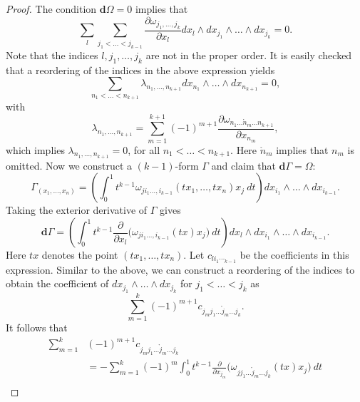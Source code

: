 \begin{proof}
The condition $\mathbf d \Omega = 0$ implies that
\begin{equation*}
	\sum_l \sum_{j_1<\dots<j_{k-1}} \frac{\partial \omega_{j_1,\dots,j_k}}{\partial x_l} dx_l\wedge dx_{j_1}\wedge \dots \wedge dx_{j_k} = 0.
\end{equation*}
Note that the indices $l,j_1,\dots,j_k$ are not in the proper order. It is easily checked that a reordering of the indices in the above expression yields
\begin{equation*}
	\sum_{n_1<\dots<n_{k+1}}\lambda_{n_1,\dots,n_{k+1}} dx_{n_1}\wedge \dots \wedge dx_{n_{k+1}} = 0,
\end{equation*}
with
\begin{equation*}
	\lambda_{n_1,\dots,n_{k+1}} = \sum_{m=1}^{k+1} (-1)^{m+1} \frac{\partial \omega_{n_1\dots\mathring n_m \dots n_{k+1}}}{\partial x_{n_m}},
\end{equation*}
which implies $\lambda_{n_1,\dots,n_{k+1}} = 0$, for all $n_1<\dots<n_{k+1}$. Here $\mathring n_m$ implies that $n_m$ is omitted. Now we construct a $(k-1)$-form $\Gamma$ and claim that $\mathbf d \Gamma = \Omega$:
\begin{equation*}
	\Gamma_{(x_1,\dots,x_n)} = \left( \int_0^1 t^{k-1} \omega_{ji_1\dots,i_{k-1}}(tx_1,\dots,tx_n) x_j \ dt \right) dx_{i_1}\wedge \dots \wedge dx_{i_{k-1}}.
\end{equation*}
Taking the exterior derivative of $\Gamma$ gives
\begin{equation*}
	\mathbf d \Gamma = \left( \int_0^1 t^{k-1} \frac{\partial }{\partial x_l} \big( \omega_{ji_1\dots,i_{k-1}}(tx) x_j \big) \ dt \right) dx_l\wedge dx_{i_1}\wedge \dots \wedge dx_{i_{k-1}}.
\end{equation*}
Here $tx$ denotes the point $(tx_1,\dots,tx_n)$. Let $c_{li_1\dotsi_{k-1}}$ be the coefficients in this expression. Similar to the above, we can construct a reordering of the indices to obtain the coefficient of $dx_{j_1}\wedge\dots\wedge dx_{j_k}$ for $j_1<\dots<j_{k}$ as
\begin{equation*}
	\sum_{m=1}^{k} (-1)^{m+1} c_{j_mj_1\dots\mathring j_{m}\dots j_k}.
\end{equation*}
It follows that
\begin{equation*}
\begin{aligned}
\sum_{m=1}^{k} &(-1)^{m+1} c_{j_mj_1\dots\mathring j_{m}\dots j_k} \\
	& = -\sum_{m=1}^k (-1)^m \int_0^1 t^{k-1} \frac{\partial}{\partial x_{j_m}}\big( \omega_{jj_1\dots\mathring j_m\dots j_k}(tx) x_j \big)\ dt \\

\end{aligned}
\end{equation*}
\end{proof}
